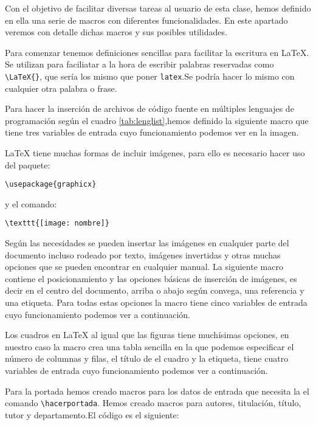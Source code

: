 Con el objetivo de facilitar diversas tareas al usuario de esta clase, hemos definido en ella una serie de macros con diferentes funcionalidades. En este apartado veremos con detalle dichas macros y sus posibles utilidades.

Para comenzar tenemos definiciones sencillas para facilitar la escritura en \LaTeX. Se utilizan para faciliatar a la hora de escribir palabras reservadas como \verb|\LaTeX{}|, que sería los mismo que poner \verb|latex|.Se podría hacer lo mismo con cualquier otra palabra o frase.

Para hacer la inserción de archivos de código fuente en múltiples lenguajes de programación según el cuadro \ref{tab:lenglist},hemos definido la siguiente macro que tiene tres variables de entrada cuyo funcionamiento podemos ver en la imagen.

\LaTeX{} tiene muchas formas de incluir imágenes, para ello es necesario hacer uso del paquete:

\noindent \verb|\usepackage{graphicx}| 

\noindent y el comando:

\noindent \verb|\texttt{[image: nombre]}|

Según las necesidades se pueden insertar las imágenes en cualquier parte del documento incluso rodeado por texto, imágenes invertidas y otras muchas opciones que se pueden encontrar en cualquier manual. La siguiente macro contiene el posicionamiento y las opciones básicas de inserción de imágenes, es decir en el centro del documento, arriba o abajo según convega, una referencia y una etiqueta. Para todas estas opciones la macro tiene cinco variables de entrada cuyo funcionamiento podemos ver a continuación.


Los cuadros en \LaTeX{} al igual que las figuras tiene muchísimas opciones, en nuestro caso la macro crea una tabla sencilla en la que podemos especificar el número de columnas y filas, el título de el cuadro y la etiqueta, tiene cuatro variables de entrada cuyo funcionamiento podemos ver a continuación.
 

Para la portada hemos creado macros para los datos de entrada que necesita la el comando \verb|\hacerportada|. Hemos creado macros para autores, titulación, título, tutor y departamento.El código es el siguiente:

